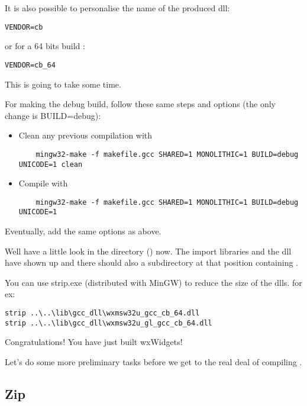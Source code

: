 It is also possible to personalise the name of the produced dll:
\begin{verbatim}
VENDOR=cb
\end{verbatim}
or for a 64 bits build :
\begin{verbatim}
VENDOR=cb_64
\end{verbatim}


This is going to take some time.

For making the debug build, follow these same steps and options (the only change is BUILD=debug):

\begin{itemize}
\item Clean any previous compilation with
	\begin{verbatim}
	mingw32-make -f makefile.gcc SHARED=1 MONOLITHIC=1 BUILD=debug UNICODE=1 clean
	\end{verbatim}
\item Compile with
	\begin{verbatim}
	mingw32-make -f makefile.gcc SHARED=1 MONOLITHIC=1 BUILD=debug UNICODE=1
	\end{verbatim}
\end{itemize}

Eventually, add the same options as above.

Well have a little look in the directory () now. The import libraries and the dll have shown up and there should also a  subdirectory at that position containing .

You can use strip.exe (distributed with MinGW) to reduce the size of the dlls.
for ex:
\begin{verbatim}
strip ..\..\lib\gcc_dll\wxmsw32u_gcc_cb_64.dll
strip ..\..\lib\gcc_dll\wxmsw32u_gl_gcc_cb_64.dll
\end{verbatim}

Congratulations! You have just built wxWidgets!

Let's do some more preliminary tasks before we get to the real deal of compiling \codeblocks.

\subsection{Zip}

